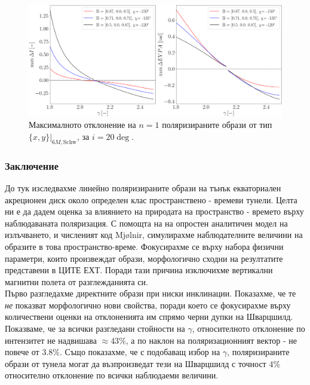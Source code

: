 \begin{figure}[!htb]
	\hspace{-0.5cm}
	\includegraphics[scale = 0.25]{WH_20_deg_param_sweep_n1.png}
	\caption[Максималното отклонение на $n=1$ поляризираните образи от тип $\{x,y\}\vert_{6M, \text{Schw}}$, за $i = 20\deg$]{Максималното отклонение на $n=1$ поляризираните образи от тип $\{x,y\}\vert_{6M, \text{Schw}}$, за $i = 20\deg$.} 
	\label{WH_max_deviation_20_deg_n1}
\end{figure}
\newpage

\subsubsection{Заключение}

До тук изследвахме линейно поляризираните образи на тънък екваториален акреционен диск около определен клас пространствено - времеви тунели. Целта ни е да дадем оценка за влиянието на природата на пространство - времето върху наблюдаваната поляризация. С помощта на на опростен аналитичен модел на излъчването, и численият код Mjølnir, симулирахме наблюдателните величини на образите в това пространство-време. Фокусирахме се върху набора физични параметри, които произвеждат образи, морфологично сходни на резултатите представени в ЦИТЕ ЕХТ. Поради тази причина изключихме вертикални магнитни полета от разглежданията си.\\

Първо разгледахме директните образи при ниски инклинации. Показахме, че те \emph{не} показват морфологично нови свойства, поради което се фокусирахме върху количествени оценки на отклоненията им спрямо черни дупки на Шварцшилд. Показваме, че за всички разгледани стойности на $\gamma$, относителното отклонение по интензитет не надвишава $\approx 43\%$, а по наклон на поляризационният вектор - не повече от $3.8\%$. Също показахме, че с подобаващ избор на $\gamma$, поляризираните образи от тунела могат да възпроизведат тези на Шварцшилд с точност $4\%$ относително отклонение по всички наблюдаеми величини. \\

